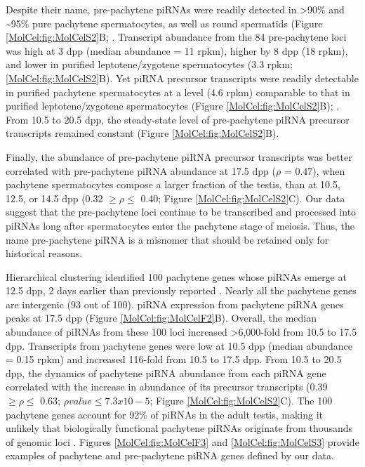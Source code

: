     Despite their name, pre-pachytene piRNAs were readily detected in >90\% and \textasciitilde95\% pure pachytene spermatocytes, as well as round spermatids (Figure \ref{MolCel:fig:MolCelS2}B; \citep{Gan2011,Modzelewski2012}. Transcript abundance from the 84 pre-pachytene loci was high at 3 dpp (median abundance = 11 rpkm), higher by 8 dpp (18 rpkm), and lower in purified leptotene/zygotene spermatocytes (3.3 rpkm; \ref{MolCel:fig:MolCelS2}B). Yet piRNA precursor transcripts were readily detectable in purified pachytene spermatocytes at a level (4.6 rpkm) comparable to that in purified leptotene/zygotene spermatocytes (Figure \ref{MolCel:fig:MolCelS2}B);  \citep{Gan2011,Modzelewski2012}. From 10.5 to 20.5 dpp, the steady-state level of pre-pachytene piRNA precursor transcripts remained constant (Figure \ref{MolCel:fig:MolCelS2}B).

    Finally, the abundance of pre-pachytene piRNA precursor transcripts was better correlated with pre-pachytene piRNA abundance at 17.5 dpp ($\rho$ = 0.47), when pachytene spermatocytes compose a larger fraction of the testis, than at 10.5, 12.5, or 14.5 dpp (0.32 $\ge \rho \le$ 0.40; Figure \ref{MolCel:fig:MolCelS2}C). Our data suggest that the pre-pachytene loci continue to be transcribed and processed into piRNAs long after spermatocytes enter the pachytene stage of meiosis. Thus, the name pre-pachytene piRNA is a misnomer that should be retained only for historical reasons.

    Hierarchical clustering identified 100 pachytene genes whose piRNAs emerge at 12.5 dpp, 2 days earlier than previously reported \citep{Girard2006}. Nearly all the pachytene genes are intergenic (93 out of 100). piRNA expression from pachytene piRNA genes peaks at 17.5 dpp (Figure \ref{MolCel:fig:MolCelF2}B). Overall, the median abundance of piRNAs from these 100 loci increased >6,000-fold from 10.5 to 17.5 dpp. Transcripts from pachytene genes were low at 10.5 dpp (median abundance = 0.15 rpkm) and increased 116-fold from 10.5 to 17.5 dpp. From 10.5 to 20.5 dpp, the dynamics of pachytene piRNA abundance from each piRNA gene correlated with the increase in abundance of its precursor transcripts (0.39 $\ge \rho \le$  0.63; $\rho value \le 7.3 x 10-5$; Figure \ref{MolCel:fig:MolCelS2}C). The 100 pachytene genes account for 92\% of piRNAs in the adult testis, making it unlikely that biologically functional pachytene piRNAs originate from thousands of genomic loci \citep{Gan2011}. Figures \ref{MolCel:fig:MolCelF3} and \ref{MolCel:fig:MolCelS3} provide examples of pachytene and pre-pachytene piRNA genes defined by our data.

